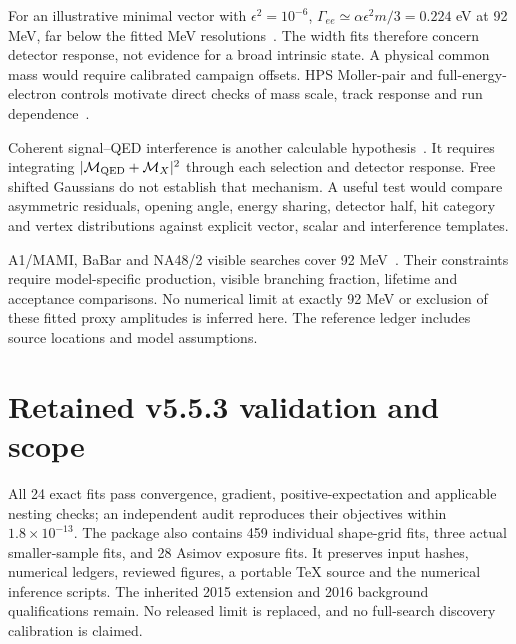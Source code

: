 \documentclass[11pt,letterpaper]{article}
\begin{document}
For an illustrative minimal vector with $\epsilon^2=10^{-6}$, $\Gamma_{ee}\simeq\alpha\epsilon^2m/3=0.224$ eV at 92 MeV, far below the fitted MeV resolutions~\cite{bjorken}. The width fits therefore concern detector response, not evidence for a broad intrinsic state. A physical common mass would require calibrated campaign offsets. HPS Moller-pair and full-energy-electron controls motivate direct checks of mass scale, track response and run dependence~\cite{hps}.

Coherent signal--QED interference is another calculable hypothesis~\cite{interference}. It requires integrating $|\mathcal M_{\rm QED}+\mathcal M_X|^2$ through each selection and detector response. Free shifted Gaussians do not establish that mechanism. A useful test would compare asymmetric residuals, opening angle, energy sharing, detector half, hit category and vertex distributions against explicit vector, scalar and interference templates.

A1/MAMI, BaBar and NA48/2 visible searches cover 92 MeV~\cite{a1,babar,na48}. Their constraints require model-specific production, visible branching fraction, lifetime and acceptance comparisons. No numerical limit at exactly 92 MeV or exclusion of these fitted proxy amplitudes is inferred here. The reference ledger includes source locations and model assumptions.

\section*{Retained v5.5.3 validation and scope}
All 24 exact fits pass convergence, gradient, positive-expectation and applicable nesting checks; an independent audit reproduces their objectives within $1.8\times10^{-13}$. The package also contains 459 individual shape-grid fits, three actual smaller-sample fits, and 28 Asimov exposure fits. It preserves input hashes, numerical ledgers, reviewed figures, a portable TeX source and the numerical inference scripts. The inherited 2015 extension and 2016 background qualifications remain. No released limit is replaced, and no full-search discovery calibration is claimed.
\end{document}
